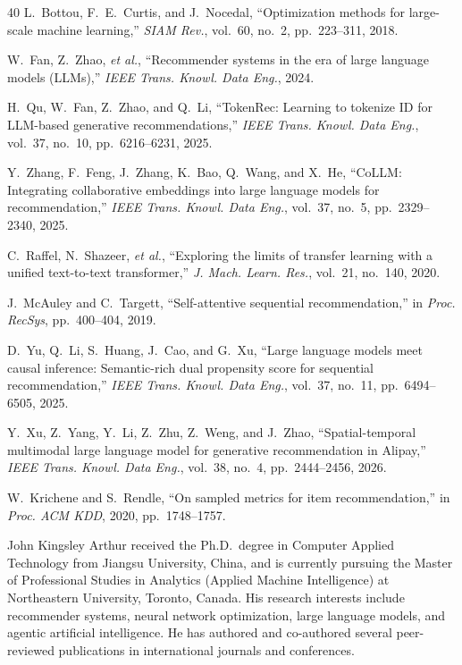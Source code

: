 \documentclass[lettersize,journal]{IEEEtran}
\begin{document}
\begin{thebibliography}{40}
L.~Bottou, F.~E.~Curtis, and J.~Nocedal,
``Optimization methods for large-scale machine learning,''
\textit{SIAM Rev.}, vol.~60, no.~2, pp.~223--311, 2018.

W.~Fan, Z.~Zhao, \textit{et al.},
``Recommender systems in the era of large language models (LLMs),''
\textit{IEEE Trans. Knowl. Data Eng.}, 2024.

H.~Qu, W.~Fan, Z.~Zhao, and Q.~Li,
``TokenRec: Learning to tokenize ID for LLM-based generative
recommendations,''
\textit{IEEE Trans. Knowl. Data Eng.}, vol.~37, no.~10,
pp.~6216--6231, 2025.

Y.~Zhang, F.~Feng, J.~Zhang, K.~Bao, Q.~Wang, and X.~He,
``CoLLM: Integrating collaborative embeddings into large language models for
recommendation,''
\textit{IEEE Trans. Knowl. Data Eng.}, vol.~37, no.~5,
pp.~2329--2340, 2025.

C.~Raffel, N.~Shazeer, \textit{et al.},
``Exploring the limits of transfer learning with a unified text-to-text
transformer,''
\textit{J. Mach. Learn. Res.}, vol.~21, no.~140, 2020.

J.~McAuley and C.~Targett,
``Self-attentive sequential recommendation,''
in \textit{Proc. RecSys}, pp.~400--404, 2019.

D.~Yu, Q.~Li, S.~Huang, J.~Cao, and G.~Xu,
``Large language models meet causal inference: Semantic-rich dual propensity
score for sequential recommendation,''
\textit{IEEE Trans. Knowl. Data Eng.}, vol.~37, no.~11,
pp.~6494--6505, 2025.

Y.~Xu, Z.~Yang, Y.~Li, Z.~Zhu, Z.~Weng, and J.~Zhao,
``Spatial-temporal multimodal large language model for generative
recommendation in Alipay,''
\textit{IEEE Trans. Knowl. Data Eng.}, vol.~38, no.~4,
pp.~2444--2456, 2026.

W.~Krichene and S.~Rendle,
``On sampled metrics for item recommendation,''
in \textit{Proc. ACM KDD}, 2020, pp.~1748--1757.

\end{thebibliography}


\begin{IEEEbiography}{John Kingsley Arthur}
received the Ph.D.\ degree in Computer Applied Technology from Jiangsu
University, China, and is currently pursuing the Master of Professional
Studies in Analytics (Applied Machine Intelligence) at Northeastern
University, Toronto, Canada. His research interests include recommender
systems, neural network optimization, large language models, and agentic
artificial intelligence. He has authored and co-authored several
peer-reviewed publications in international journals and conferences.
\end{IEEEbiography}
\end{document}
